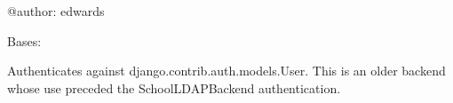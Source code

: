 \documentclass[letterpaper,10pt,english]{sphinxmanual}
\begin{document}
@author: edwards


\begin{fulllineitems}
\label{generated/apps.profiles.backends:apps.profiles.backends.EmailModelBackend}
Bases: 

Authenticates against django.contrib.auth.models.User.  This is an older backend whose use
preceded the SchoolLDAPBackend authentication.


\begin{fulllineitems}
\label{generated/apps.profiles.backends:apps.profiles.backends.EmailModelBackend.authenticate}
\end{fulllineitems}


\end{fulllineitems}


\end{document}
